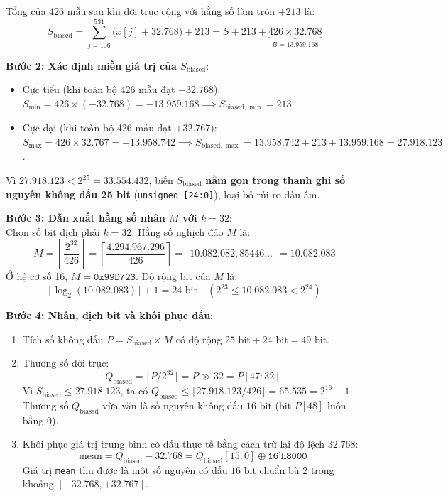 Tổng của $426\text{ mẫu}$ sau khi dời trục cộng với hằng số làm tròn $+213$ là:
\begin{equation}
S_{\text{biased}} = \sum_{j=106}^{531} \Big( x[j] + 32.768 \Big) + 213 = S + 213 + \underbrace{426 \times 32.768}_{B = 13.959.168}
\end{equation}

\textbf{Bước 2: Xác định miền giá trị của $S_{\text{biased}}$}:
\begin{itemize}[leftmargin=1.5em, itemsep=2pt]
    \item Cực tiểu (khi toàn bộ 426 mẫu đạt $-32.768$): $S_{\min} = 426 \times (-32.768) = -13.959.168 \implies S_{\text{biased},\min} = 213$.
    \item Cực đại (khi toàn bộ 426 mẫu đạt $+32.767$): $S_{\max} = 426 \times 32.767 = +13.958.742 \implies S_{\text{biased},\max} = 13.958.742 + 213 + 13.959.168 = \mathbf{27.918.123}$.
\end{itemize}
Vì $27.918.123 < 2^{25} = 33.554.432$, biến $S_{\text{biased}}$ \textbf{nằm gọn trong thanh ghi số nguyên không dấu 25 bit} (\texttt{unsigned [24:0]}), loại bỏ rủi ro dấu âm.

\textbf{Bước 3: Dẫn xuất hằng số nhân $M$ với $k = 32$}:\\
Chọn số bit dịch phải $k = 32$. Hằng số nghịch đảo $M$ là:
\begin{equation}
M = \left\lceil \frac{2^{32}}{426} \right\rceil = \left\lceil \frac{4.294.967.296}{426} \right\rceil = \lceil 10.082.082{,}85446 \dots \rceil = \mathbf{10.082.083}
\end{equation}
Ở hệ cơ số 16, $M = \texttt{0x99D723}$. Độ rộng bit của $M$ là:
\begin{equation}
\lfloor \log_2(10.082.083) \rfloor + 1 = 24\text{ bit} \quad (2^{23} \le 10.082.083 < 2^{24})
\end{equation}

\textbf{Bước 4: Nhân, dịch bit và khôi phục dấu}:
\begin{enumerate}[leftmargin=1.5em, itemsep=2pt]
    \item Tích số không dấu $P = S_{\text{biased}} \times M$ có độ rộng $25\text{ bit} + 24\text{ bit} = 49\text{ bit}$.
    \item Thương số dời trục:
    \begin{equation}
    Q_{\text{biased}} = \lfloor P / 2^{32} \rfloor = P \gg 32 = P[47:32]
    \end{equation}
    Vì $S_{\text{biased}} \le 27.918.123$, ta có $Q_{\text{biased}} \le \lfloor 27.918.123 / 426 \rfloor = 65.535 = 2^{16} - 1$. Thương số $Q_{\text{biased}}$ vừa vặn là số nguyên không dấu $16\text{ bit}$ (bit $P[48]$ luôn bằng $0$).
    \item Khôi phục giá trị trung bình có dấu thực tế bằng cách trừ lại độ lệch $32.768$:
    \begin{equation}
    \text{mean} = Q_{\text{biased}} - 32.768 = Q_{\text{biased}}[15:0] \oplus \texttt{16'h8000}
    \end{equation}
    Giá trị \texttt{mean} thu được là một số nguyên có dấu $16\text{ bit}$ chuẩn bù 2 trong khoảng $[-32.768, +32.767]$.
\end{enumerate}

